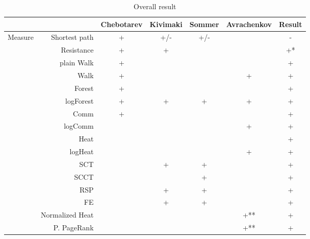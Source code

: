 \documentclass{article}
\begin{document}
\begin{table}[H]
\centering
\caption{Overall result}
\label{my-label}
\begin{tabular}{rr|cccc|c}
                &                          & Chebotarev & Kivimaki & Sommer & Avrachenkov & Result \\
                \hline
\multirow{18}{*}{Measure} & Shortest path  & +          & \cellcolor{red!25} +/- & \cellcolor{red!25} +/- & & \cellcolor{red!25} - \\
                & Resistance               & +          & +        &        &             &  \cellcolor{yellow!25} +* \\
                & plain Walk               & +          &          &        &             & +      \\
                & Walk                     & +          &          &        & +           & +      \\
                & Forest                   & +          &          &        &             & +      \\
                & logForest                & +          & +        & +      & +           & +      \\
                & Comm                     & +          &          &        &             & +      \\
                & logComm                  &            &          &        & +           & +      \\
                & Heat                     &            &          &        &             & \cellcolor{yellow!25} + \\
                & logHeat                  &            &          &        & +           & +      \\
                & SCT                      &            & +        & +      &             & +      \\
                & SCCT                     &            &          & +      &             & +      \\
                & RSP                      &            & +        & +      &             & +      \\
                & FE                       &            & +        & +      &             & +      \\
                & Normalized Heat          &            &          &        & +**         & \cellcolor{yellow!25} + \\
                & P. PageRank              &            &          &        & +**         & \cellcolor{yellow!25} + \\

\end{tabular}
\end{table}
\end{document}
